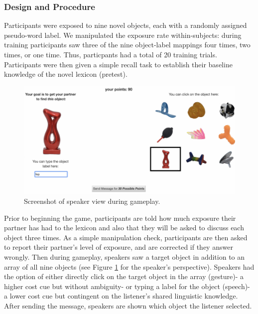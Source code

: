 \documentclass[10pt, letterpaper]{article}
\newenvironment{CodeChunk}{}{}
\begin{document}
\subsubsection{Design and Procedure}\label{design-and-procedure}

Participants were exposed to nine novel objects, each with a randomly
assigned pseudo-word label. We manipulated the exposure rate
within-subjects: during training participants saw three of the nine
object-label mappings four times, two times, or one time. Thus,
particpants had a total of 20 training trials. Participants were then
given a simple recall task to establish their baseline knowledge of the
novel lexicon (pretest).

\begin{CodeChunk}
\begin{figure}[tb]

{\centering \includegraphics{figs/exp_screenshot-1} 

}

\caption[Screenshot of speaker view during gameplay]{Screenshot of speaker view during gameplay.}\label{fig:exp_screenshot}
\end{figure}
\end{CodeChunk}

Prior to beginning the game, participants are told how much exposure
their partner has had to the lexicon and also that they will be asked to
discuss each object three times. As a simple manipulation check,
participants are then asked to report their partner's level of exposure,
and are corrected if they answer wrongly. Then during gameplay, speakers
saw a target object in addition to an array of all nine objects (see
Figure \ref{fig:exp_screenshot} for the speaker's perspective). Speakers
had the option of either directly click on the target object in the
array (gesture)- a higher cost cue but without ambiguity- or typing a
label for the object (speech)- a lower cost cue but contingent on the
listener's shared linguistic knowledge. After sending the message,
speakers are shown which object the listener selected.
\end{document}
